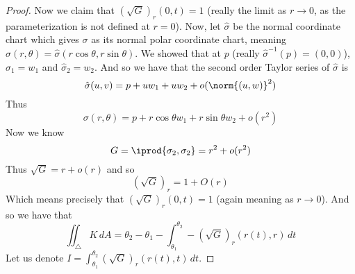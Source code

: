 \begin{proof}
    Now we claim that $(\sqrt G)_r(0,t)=1$ (really the limit as $r\to0$, as the parameterization is not defined at $r=0$).
    Now, let $\hat\sigma$ be the normal coordinate chart which gives $\sigma$ as its normal polar coordinate chart, meaning $\sigma(r,\theta)=\hat\sigma(r\cos\theta,r\sin\theta)$.
    We showed that at $p$ (really $\hat\sigma^{-1}(p)=(0,0)$), $\hat\sigma_1=w_1$ and $\hat\sigma_2=w_2$.
    And so we have that the second order Taylor series of $\hat\sigma$ is
    \[ \hat\sigma(u,v) = p + uw_1 + uw_2 + o(\norm{(u,w)}^2) \]
    Thus
    \[ \sigma(r,\theta) = p + r\cos\theta w_1 + r\sin\theta w_2 + o(r^2) \]
    Now we know
    \[ G=\iprod{\sigma_2,\sigma_2} = r^2 + o(r^2) \]
    Thus $\sqrt G=r+o(r)$ and so
    \[ (\sqrt G)_r = 1 + O(r) \]
    Which means precisely that $(\sqrt G)_r(0,t)=1$ (again meaning as $r\to0$).
    And so we have that
    \[ \iint_\triangle K\,dA = \theta_2 - \theta_1 - \int_{\theta_1}^{\theta_2}-(\sqrt G)_r(r(t),r)\,dt \]
    Let us denote $I=\int_{\theta_1}^{\theta_2}(\sqrt G)_r(r(t),t)\,dt$.


\end{proof}
